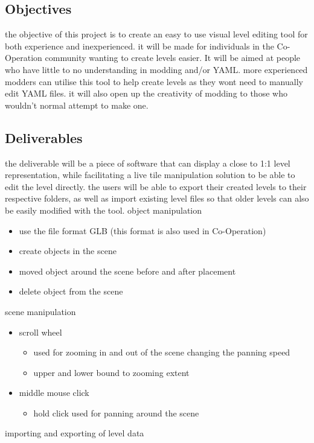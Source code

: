 \subsection{Objectives}
the objective of this project is to create an easy to use visual level editing tool for both experience and inexperienced. it will be made for individuals in the Co-Operation community wanting to create levels easier. It will be aimed at people who have little to no understanding in modding and/or YAML. more experienced modders can utilise this tool to help create levels as they wont need to manually edit YAML files. it will also open up the creativity of modding to those who wouldn't normal attempt to make one.
\subsection{Deliverables}
the deliverable will be a piece of software that can display a close to 1:1 level representation, while facilitating a live tile manipulation solution to be able to edit the level directly. the users will be able to export their created levels to their respective folders, as well as import existing level files so that older levels can also be easily modified with the tool.
object manipulation
\begin{itemize}
    \item use the file format GLB (this format is also used in Co-Operation)
    \item create objects in the scene
    \item moved object around the scene before and after placement
    \item delete object from the scene
\end{itemize}
scene manipulation
\begin{itemize}
	\item scroll wheel
	\begin{itemize}
		\item used for zooming in and out of the scene changing the panning speed
		\item upper and lower bound to zooming extent
	\end{itemize}
	\item middle mouse click
	\begin{itemize}
		\item hold click used for panning around the scene
	\end{itemize}
\end{itemize}
importing and exporting of level data
